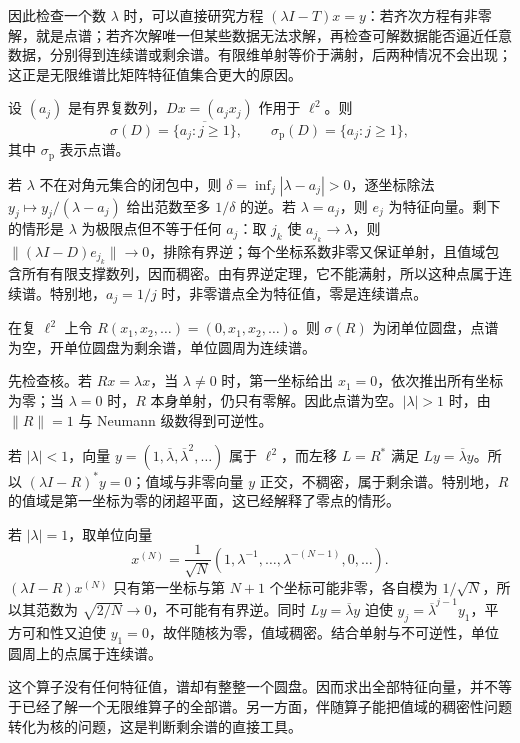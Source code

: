 因此检查一个数 $\lambda$ 时，可以直接研究方程 $(\lambda I-T)x=y$：若齐次方程有非零解，就是点谱；若齐次解唯一但某些数据无法求解，再检查可解数据能否逼近任意数据，分别得到连续谱或剩余谱。有限维单射等价于满射，后两种情况不会出现；这正是无限维谱比矩阵特征值集合更大的原因。

\begin{example}[对角算子的谱逐项可算]\label{ex:fa-diagonal-spectrum}
设 $(a_j)$ 是有界复数列，$Dx=(a_jx_j)$ 作用于 $\ell^2$。则
\[
 \sigma(D)=\overline{\{a_j:j\geq1\}},\qquad
 \sigma_{\mathrm p}(D)=\{a_j:j\geq1\},
\]
其中 $\sigma_{\mathrm p}$ 表示点谱。
\end{example}
\begin{solve}
若 $\lambda$ 不在对角元集合的闭包中，则 $\delta=\inf_j|\lambda-a_j|>0$，逐坐标除法 $y_j\mapsto y_j/(\lambda-a_j)$ 给出范数至多 $1/\delta$ 的逆。若 $\lambda=a_j$，则 $e_j$ 为特征向量。剩下的情形是 $\lambda$ 为极限点但不等于任何 $a_j$：取 $j_k$ 使 $a_{j_k}\to\lambda$，则 $\|(\lambda I-D)e_{j_k}\|\to0$，排除有界逆；每个坐标系数非零又保证单射，且值域包含所有有限支撑数列，因而稠密。由有界逆定理，它不能满射，所以这种点属于连续谱。特别地，$a_j=1/j$ 时，非零谱点全为特征值，零是连续谱点。
\end{solve}

\begin{example}[右移算子的剩余谱]\label{ex:fa-shift-spectrum}
在复 $\ell^2$ 上令 $R(x_1,x_2,\ldots)=(0,x_1,x_2,\ldots)$。则 $\sigma(R)$ 为闭单位圆盘，点谱为空，开单位圆盘为剩余谱，单位圆周为连续谱。
\end{example}
\begin{solve}
先检查核。若 $Rx=\lambda x$，当 $\lambda\ne0$ 时，第一坐标给出 $x_1=0$，依次推出所有坐标为零；当 $\lambda=0$ 时，$R$ 本身单射，仍只有零解。因此点谱为空。$|\lambda|>1$ 时，由 $\|R\|=1$ 与 Neumann 级数得到可逆性。

若 $|\lambda|<1$，向量 $y=(1,\overline\lambda,\overline\lambda^2,\ldots)$ 属于 $\ell^2$，而左移 $L=R^*$ 满足 $Ly=\overline\lambda y$。所以 $(\lambda I-R)^*y=0$；值域与非零向量 $y$ 正交，不稠密，属于剩余谱。特别地，$R$ 的值域是第一坐标为零的闭超平面，这已经解释了零点的情形。

若 $|\lambda|=1$，取单位向量
\[
 x^{(N)}=\frac1{\sqrt N}(1,\lambda^{-1},\ldots,\lambda^{-(N-1)},0,\ldots).
\]
$ (\lambda I-R)x^{(N)}$ 只有第一坐标与第 $N+1$ 个坐标可能非零，各自模为 $1/\sqrt N$，所以其范数为 $\sqrt{2/N}\to0$，不可能有有界逆。同时 $Ly=\overline\lambda y$ 迫使 $y_j=\overline\lambda^{j-1}y_1$，平方可和性又迫使 $y_1=0$，故伴随核为零，值域稠密。结合单射与不可逆性，单位圆周上的点属于连续谱。
\end{solve}
这个算子没有任何特征值，谱却有整整一个圆盘。因而求出全部特征向量，并不等于已经了解一个无限维算子的全部谱。另一方面，伴随算子能把值域的稠密性问题转化为核的问题，这是判断剩余谱的直接工具。

